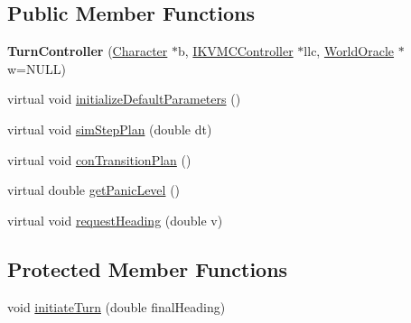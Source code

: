 \subsection*{Public Member Functions}
\begin{DoxyCompactItemize}
\item 
\hypertarget{classCartWheel_1_1Core_1_1TurnController_aefac57833d093fb6c90a66e29b4bcbf5}{
{\bfseries TurnController} (\hyperlink{classCartWheel_1_1Core_1_1Character}{Character} $\ast$b, \hyperlink{classCartWheel_1_1Core_1_1IKVMCController}{IKVMCController} $\ast$llc, \hyperlink{classCartWheel_1_1Core_1_1WorldOracle}{WorldOracle} $\ast$w=NULL)}
\label{classCartWheel_1_1Core_1_1TurnController_aefac57833d093fb6c90a66e29b4bcbf5}

\item 
virtual void \hyperlink{classCartWheel_1_1Core_1_1TurnController_a5a81b94dd968bcf38ae0008608303bf9}{initializeDefaultParameters} ()
\item 
virtual void \hyperlink{classCartWheel_1_1Core_1_1TurnController_af0157d75af6f328d1241d8c12954128e}{simStepPlan} (double dt)
\item 
virtual void \hyperlink{classCartWheel_1_1Core_1_1TurnController_afcf84411a212ce8b05b27f1ba09c7892}{conTransitionPlan} ()
\item 
virtual double \hyperlink{classCartWheel_1_1Core_1_1TurnController_ab764c0ea836cc7c58fc7cbe2c8ece882}{getPanicLevel} ()
\item 
virtual void \hyperlink{classCartWheel_1_1Core_1_1TurnController_a40ddbfce3d1b09956aeff59a17f1de6e}{requestHeading} (double v)
\end{DoxyCompactItemize}
\subsection*{Protected Member Functions}
\begin{DoxyCompactItemize}
\item 
void \hyperlink{classCartWheel_1_1Core_1_1TurnController_a875649169829e7e31734cb0dee2e8676}{initiateTurn} (double finalHeading)
\end{DoxyCompactItemize}
